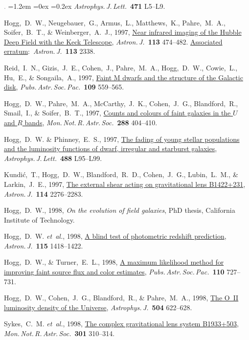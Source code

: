 \documentclass[10pt,letterpaper]{article}
\newcommand{\foreign}[1]{\textsl{#1}}
\newcommand{\etal}{\foreign{et~al.}}
\newcommand{\doi}[2]{\href{http://dx.doi.org/#1}{{#2}}}
\newcommand{\ads}[2]{\href{http://adsabs.harvard.edu/abs/#1}{{#2}}}
\newcommand{\deemph}[1]{\textcolor{grey}{\footnotesize{#1}}}
\newcommand{\pubnumber}[1]{\deemph{{#1}.}}
\newcounter{refpubnum}
\newcommand{\hogglist}{%
    \rightmargin=0in
    \leftmargin=1.2em
    \topsep=0ex
    \partopsep=0pt
    \itemsep=0.2ex
    \parsep=0pt
    \itemindent=-1.0\leftmargin
    \listparindent=0.0\leftmargin
    \settowidth{\labelsep}{~}
    \usecounter{refpubnum}
  }
\begin{document}
\begin{list}{\pubnumber{\therefpubnum}}{\hogglist}
\textit{Astrophys.\,J.\,Lett.}\ \textbf{471} L5--L9.
\item
Hogg,~D.~W., Neugebauer,~G., Armus,~L., Matthews,~K., Pahre,~M.~A., Soifer,~B.~T.,
\& Weinberger,~A.~J., 1997,
\doi{10.1086/118269}{Near infrared imaging of the Hubble Deep Field with the Keck Telescope},
\textit{Astron.\,J.}\ \textbf{113} 474--482.
\doi{10.1086/118445}{Associated erratum}:\ \textit{Astron.\,J.}\ \textbf{113} 2338.
\item
Reid,~I.~N., Gizis,~J.~E., Cohen,~J., Pahre,~M.~A., Hogg,~D.~W., Cowie,~L., Hu,~E., \& Songaila,~A., 1997,
\ads{1997PASP..109..559R}{Faint M dwarfs and the structure of the Galactic disk},
\textit{Pubs.\,Astr.\,Soc.\,Pac.}\ \textbf{109} 559--565.
\item
Hogg,~D.~W., Pahre,~M.~A., McCarthy,~J.~K., Cohen,~J.~G., Blandford,~R., Smail,~I., \& Soifer,~B.~T., 1997,
\ads{1997MNRAS.288..404H}{Counts and colours of faint galaxies in the $U$ and $R$ bands},
\textit{Mon.\,Not.\,R.\,Astr.\,Soc.}\ \textbf{288} 404--410.
\item
Hogg,~D.~W. \& Phinney,~E.~S., 1997,
\doi{10.1086/310929}{The fading of young stellar populations and the luminosity functions of dwarf, irregular and starburst galaxies},
\textit{Astrophys.\,J.\,Lett.}\ \textbf{488} L95--L99.
\item
Kundi\'c,~T., Hogg,~D.~W., Blandford,~R.~D., Cohen,~J.~G., Lubin,~L.~M., \& Larkin,~J.~E., 1997,
\doi{10.1086/118647}{The external shear acting on gravitational lens B1422+231},
\textit{Astron.\,J.}\ \textbf{114} 2276--2283.
\item
Hogg,~D.~W., 1998,
{\textit{On the evolution of field galaxies},}
PhD thesis, California Institute of Technology.
\item
Hogg,~D.~W. \etal, 1998,
\doi{10.1086/300277}{A blind test of photometric redshift prediction},
\textit{Astron.\,J.}\ \textbf{115} 1418--1422.
\item
Hogg,~D.~W., \& Turner,~E.~L., 1998,
\ads{1998PASP..110..727H}{A maximum likelihood method for improving faint source flux and color estimates},
\textit{Pubs.\,Astr.\,Soc.\,Pac.}\ \textbf{110} 727--731.
\item
Hogg,~D.~W., Cohen,~J.~G., Blandford,~R., \& Pahre,~M.~A., 1998,
\doi{10.1086/306122}{The O~II luminosity density of the Universe},
\textit{Astrophys.\,J.}\ \textbf{504} 622--628.
\item
Sykes,~C.~M. \etal, 1998,
\doi{10.1046/j.1365-8711.1998.02081.x}{The complex gravitational lens system B1933+503},
\textit{Mon.\,Not.\,R.\,Astr.\,Soc.}\ \textbf{301} 310--314.

\end{list}
\end{document}
